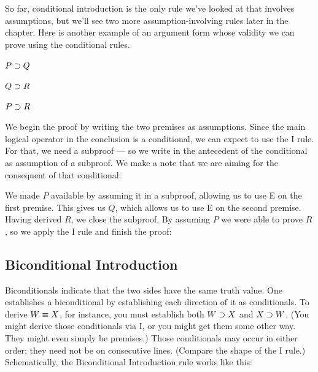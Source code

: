 So far, conditional introduction is the only rule we've looked at that involves assumptions, but we'll see two more assumption-involving rules later in the chapter.
Here is another example of an argument form whose validity we can prove using the conditional rules.


\begin{earg}
\item[] $P \supset Q$
\item[] $Q \supset R$
\item[\therefore] $P \supset R$
\end{earg}
We begin the proof by writing the two premises as assumptions. Since the main logical operator in the conclusion is a conditional, we can expect to use the {\eif}I rule. For that, we need a subproof --- so we write in the antecedent of the conditional as assumption of a subproof. We make a note that we are aiming for the consequent of that conditional:

\begin{ndproof}
	\open
		 
	\close
\end{ndproof}

We made $P$ available by assuming it in a subproof, allowing us to use {\eif}E on the first premise. This gives us $Q$, which allows us to use {\eif}E on the second premise. Having derived $R$, we close the subproof. By assuming $P$ we were able to prove $R$, so we apply the {\eif}I rule and finish the proof:
\label{HSproof}
\begin{ndproof}
	\open
	\close
\end{ndproof}




\subsection{Biconditional Introduction}
Biconditionals indicate that the two sides have the same truth value. One establishes a biconditional by establishing each direction of it as conditionals. To derive $W \equiv X$, for instance, you must establish both $W \supset X$ and $X \supset W$. (You might derive those conditionals via {\eif}I, or you might get them some other way. They might even simply be premises.) Those conditionals may occur in either order; they need not be on consecutive lines. (Compare the shape of the {\eand}I rule.) Schematically, the Biconditional Introduction rule works like this:

